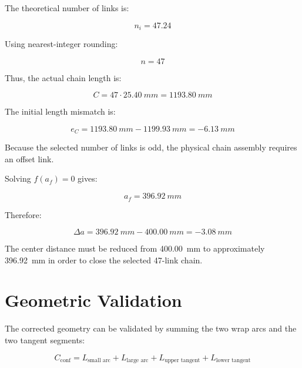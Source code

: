 \documentclass[11pt,a4paper]{article}
\begin{document}
The theoretical number of links is:

\begin{equation}
    n_i = 47.24
\end{equation}

Using nearest-integer rounding:

\begin{equation}
    n = 47
\end{equation}

Thus, the actual chain length is:

\begin{equation}
    C = 47 \cdot \SI{25.40}{mm} = \SI{1193.80}{mm}
\end{equation}

The initial length mismatch is:

\begin{equation}
    e_C = \SI{1193.80}{mm} - \SI{1199.93}{mm} = \SI{-6.13}{mm}
\end{equation}

Because the selected number of links is odd, the physical chain assembly requires an offset link.

Solving $f(a_f)=0$ gives:

\begin{equation}
    a_f = \SI{396.92}{mm}
\end{equation}

Therefore:

\begin{equation}
    \Delta a = \SI{396.92}{mm} - \SI{400.00}{mm} = \SI{-3.08}{mm}
\end{equation}

The center distance must be reduced from \SI{400.00}{mm} to approximately \SI{396.92}{mm} in order to close the selected 47-link chain.

\section{Geometric Validation}

The corrected geometry can be validated by summing the two wrap arcs and the two tangent segments:

\begin{equation}
    C_{\text{conf}} =
    L_{\text{small arc}}
    +
    L_{\text{large arc}}
    +
    L_{\text{upper tangent}}
    +
    L_{\text{lower tangent}}
\end{equation}
\end{document}
